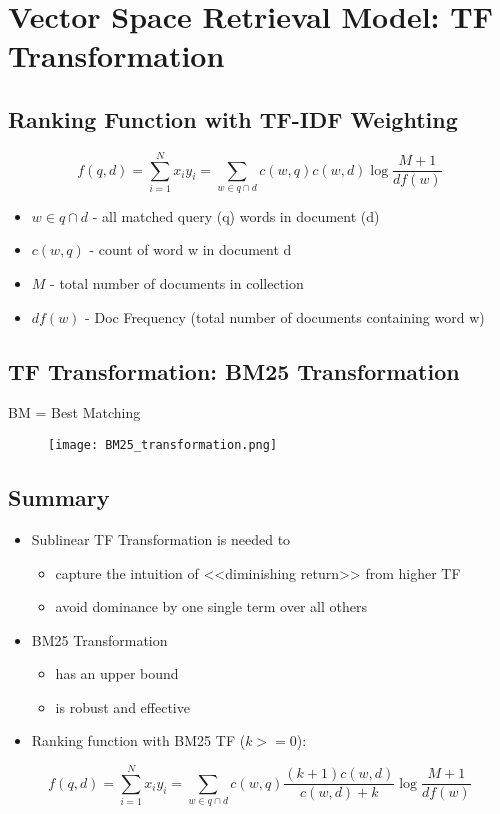 \section{Vector Space Retrieval Model: TF Transformation}


\subsection{Ranking Function with TF-IDF Weighting}

\begin{equation*}
f(q, d) = \sum_{i=1}^N x_i y_i = \sum_{w \in q \cap d} c(w, q) c(w, d) \log \frac{M+1}{df(w)}
\end{equation*}

\begin{itemize}
\item $w \in q \cap d$ - all matched query (q) words in document (d)
\item $c(w, q)$ - count of word w in document d
\item $M$ - total number of documents in collection
\item $df(w)$ - Doc Frequency (total number of documents containing word w)
\end{itemize}




\subsection{TF Transformation: BM25 Transformation}
BM = Best Matching

\begin{figure}[H]
    \centering
    \texttt{[image: BM25\_transformation.png]}
\end{figure}




\subsection{Summary}
\begin{itemize}
\item Sublinear TF Transformation is needed to
\begin{itemize}
\item capture the intuition of <<diminishing return>> from higher TF 
\item avoid dominance by one single term over all others
\end{itemize}

\item BM25 Transformation 
\begin{itemize}
\item has an upper bound
\item is robust and effective
\end{itemize}

\item Ranking function with BM25 TF ($k >= 0$):
\end{itemize}

\begin{equation*}
f(q, d) = \sum_{i=1}^N x_i y_i = \sum_{w \in q \cap d} c(w, q) \frac{(k+1) c(w, d)}{c(w, d) + k} \log \frac{M+1}{df(w)}
\end{equation*}